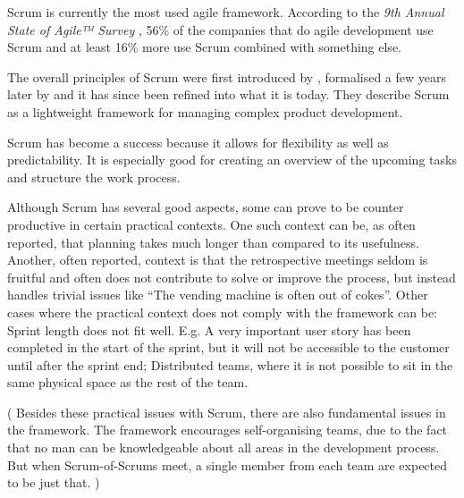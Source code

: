 
Scrum is currently the most used agile framework. According to the \textit{9th Annual State of Agile™ Survey} \citep{VersionOne}, 56\% of the companies that do agile development use Scrum and at least 16\% more use Scrum combined with something else.

The overall principles of Scrum were first introduced by \citet{Takeuchi1986}, formalised a few years later by \citet{Schwaber} and it has since been refined into what it is today.
They describe Scrum as a lightweight framework for managing complex product development. 

Scrum has become a success because it allows for flexibility as well as predictability.
It is especially good for creating an overview of the upcoming tasks and structure the work process.

Although Scrum has several good aspects, some can prove to be counter productive in certain practical contexts.
One such context can be, as often reported, that planning takes much longer than compared to its usefulness.
Another, often reported, context is that the retrospective meetings seldom is fruitful and often does not contribute to solve or improve the process, but instead handles trivial issues like “The vending machine is often out of cokes”.
Other cases where the practical context does not comply with the framework can be:
Sprint length does not fit well. E.g. A very important user story has been completed in the start of the sprint, but it will not be accessible to the customer until after the sprint end;
Distributed teams, where it is not possible to sit in the same physical space as the rest of the team.

(
Besides these practical issues with Scrum, there are also fundamental issues in the framework.
The framework encourages self-organising teams, due to the fact that no man can be knowledgeable about all areas in the development process. But when Scrum-of-Scrums meet, a single member from each team are expected to be just that.
)
 

